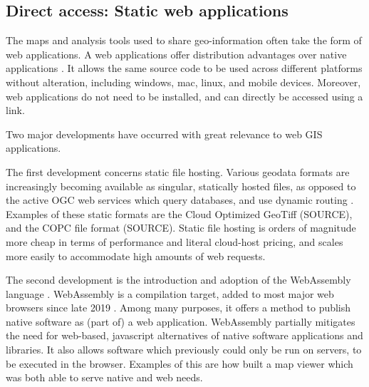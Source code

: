 




\subsection*{Direct access: Static web applications}

The maps and analysis tools used to share geo-information often take the form of web applications.  
A web applications offer distribution advantages over native applications \citep{kuhail_characterizing_2021, panidi_hybrid_2015}. 
It allows the same source code to be used across different platforms without alteration, including windows, mac, linux, and mobile devices. 
Moreover, web applications do not need to be installed, and can directly be accessed using a link. 

Two major developments have occurred with great relevance to web GIS applications.

The first development concerns static file hosting.
Various geodata formats are increasingly becoming available as singular, statically hosted files, 
as opposed to the active \ac{OGC} web services which query databases, and use dynamic routing \citep{open_geospatial_consortium_web_2015}.
Examples of these static formats are the Cloud Optimized GeoTiff (SOURCE), and the COPC file format (SOURCE). 
Static file hosting is orders of magnitude more cheap in terms of performance and literal cloud-host pricing, and scales more easily to accommodate high amounts of web requests.

The second development is the introduction and adoption of the WebAssembly language \citep{haas_bringing_2017}. 
WebAssembly is a compilation target, added to most major web browsers since late 2019 \citep{w3c_world_2019}. 
Among many purposes, it offers a method to publish native software as (part of) a web application. 
WebAssembly partially mitigates the need for web-based, javascript alternatives of native software applications and libraries. 
It also allows software which previously could only be run on servers, to be executed in the browser. 
Examples of this are how \citet{ammann_maplibre-rs_2022} built a map viewer which was both able to serve native and web needs.

